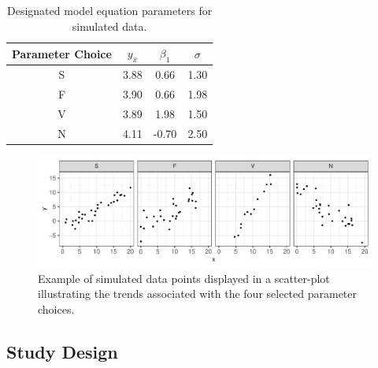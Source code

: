 \documentclass[12pt]{article}
\begin{document}
\begin{table}

\caption{\label{tab:eyefitting-parameters}Designated model equation parameters for simulated data.}
\centering
\begin{tabular}[t]{cccc}
\toprule
Parameter Choice & $y_{\bar{x}}$ & $\beta_1$ & $\sigma$\\
\midrule
S & 3.88 & 0.66 & 1.30\\
F & 3.90 & 0.66 & 1.98\\
V & 3.89 & 1.98 & 1.50\\
N & 4.11 & -0.70 & 2.50\\
\bottomrule
\end{tabular}
\end{table}

\begin{figure}[tbp]

{\centering \includegraphics[width=1\linewidth,]{Eye-Fitting-Straight-Lines-in-the-Modern-Era_files/figure-latex/eyefitting-simplot-1} 

}

\caption{Example of simulated data points displayed in a scatter-plot illustrating the trends associated with the four selected parameter choices.}\label{fig:eyefitting-simplot}
\end{figure}

\hypertarget{study-design}{%
\subsection{Study Design}\label{study-design}}
\end{document}

